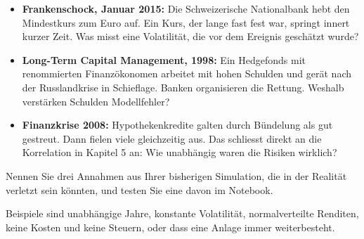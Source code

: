 \begin{itemize}
	\item \textbf{Frankenschock, Januar 2015:} Die Schweizerische Nationalbank hebt den Mindestkurs zum Euro auf. Ein Kurs, der lange fast fest war, springt innert kurzer Zeit. Was misst eine Volatilität, die vor dem Ereignis geschätzt wurde?
	\item \textbf{Long-Term Capital Management, 1998:} Ein Hedgefonds mit renommierten Finanzökonomen arbeitet mit hohen Schulden und gerät nach der Russlandkrise in Schieflage. Banken organisieren die Rettung. Weshalb verstärken Schulden Modellfehler?
	\item \textbf{Finanzkrise 2008:} Hypothekenkredite galten durch Bündelung als gut gestreut. Dann fielen viele gleichzeitig aus. Das schliesst direkt an die Korrelation in Kapitel 5 an: Wie unabhängig waren die Risiken wirklich?
\end{itemize}

\begin{myexercise}[Modellkritik]
	Nennen Sie drei Annahmen aus Ihrer bisherigen Simulation, die in der Realität verletzt sein könnten, und testen Sie eine davon im Notebook.
	\begin{myanswer}
		Beispiele sind unabhängige Jahre, konstante Volatilität, normalverteilte Renditen, keine Kosten und keine Steuern, oder dass eine Anlage immer weiterbesteht.
	\end{myanswer}
\end{myexercise}
